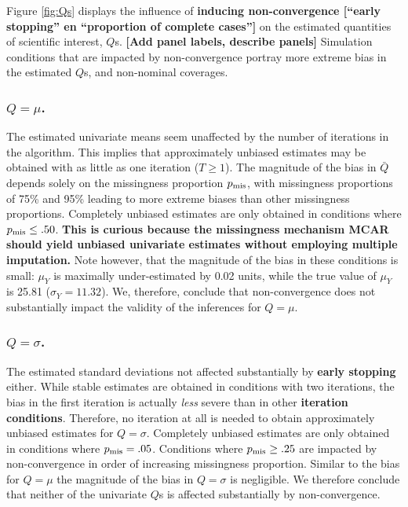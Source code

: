 \documentclass[Royal,times,sageh]{sagej}
\begin{document}
Figure \ref{fig:Qs} displays the influence of \textbf{inducing non-convergence {[}``early stopping'' en ``proportion of complete cases''{]}} on the estimated quantities of scientific interest, \(Q\)s. \textbf{{[}Add panel labels, describe panels{]}} Simulation conditions that are impacted by non-convergence portray more extreme bias in the estimated \(Q\)s, and non-nominal coverages.

\hypertarget{qmu.}{%
\subsubsection{\texorpdfstring{\(Q=\mu\).}{Q=\textbackslash mu.}}\label{qmu.}}

The estimated univariate means seem unaffected by the number of iterations in the algorithm. This implies that approximately unbiased estimates may be obtained with as little as one iteration (\(T \geq 1\)). The magnitude of the bias in \(\bar{Q}\) depends solely on the missingness proportion \(p_{\rm mis}\), with missingness proportions of 75\% and 95\% leading to more extreme biases than other missingness proportions. Completely unbiased estimates are only obtained in conditions where \(p_{\rm mis}\leq.50\). \textbf{This is curious because the missingness mechanism MCAR should yield unbiased univariate estimates without employing multiple imputation.} Note however, that the magnitude of the bias in these conditions is small: \(\mu_Y\) is maximally under-estimated by 0.02 units, while the true value of \(\mu_Y\) is 25.81 (\(\sigma_Y = 11.32\)). We, therefore, conclude that non-convergence does not substantially impact the validity of the inferences for \(Q=\mu\).

\hypertarget{qsigma.}{%
\subsubsection{\texorpdfstring{\(Q=\sigma\).}{Q=\textbackslash sigma.}}\label{qsigma.}}

The estimated standard deviations not affected substantially by \textbf{early stopping} either. While stable estimates are obtained in conditions with two iterations, the bias in the first iteration is actually \emph{less} severe than in other \textbf{iteration conditions}. Therefore, no iteration at all is needed to obtain approximately unbiased estimates for \(Q=\sigma\). Completely unbiased estimates are only obtained in conditions where \(p_{\rm mis}=.05\). Conditions where \(p_{\rm mis}\geq.25\) are impacted by non-convergence in order of increasing missingness proportion. Similar to the bias for \(Q=\mu\) the magnitude of the bias in \(Q=\sigma\) is negligible. We therefore conclude that neither of the univariate \(Q\)s is affected substantially by non-convergence.
\end{document}
